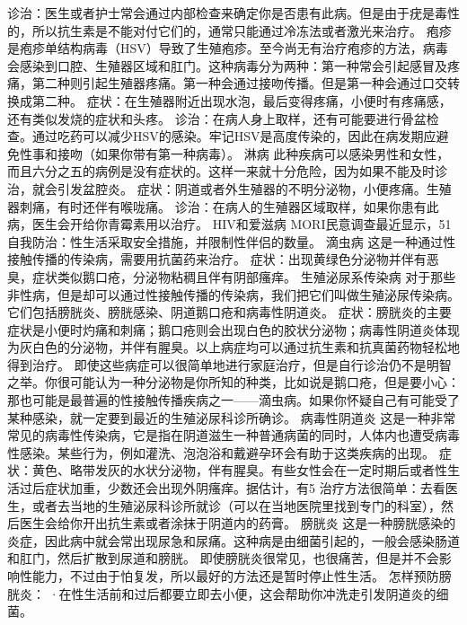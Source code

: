 \documentclass[12pt,UTF8,openany]{ctexbook}
\begin{document}
诊治：医生或者护士常会通过内部检查来确定你是否患有此病。但是由于疣是毒性的，所以抗生素是不能对付它们的，通常只能通过冷冻法或者激光来治疗。
疱疹
是疱疹单结构病毒（HSV）导致了生殖疱疹。至今尚无有治疗疱疹的方法，病毒会感染到口腔、生殖器区域和肛门。这种病毒分为两种：第一种常会引起感冒及疼痛，第二种则引起生殖器疼痛。第一种会通过接吻传播。但是第一种会通过口交转换成第二种。
症状：在生殖器附近出现水泡，最后变得疼痛，小便时有疼痛感，还有类似发烧的症状和头疼。
诊治：在病人身上取样，还有可能要进行骨盆检查。通过吃药可以减少HSV的感染。牢记HSV是高度传染的，因此在病发期应避免性事和接吻（如果你带有第一种病毒）。
淋病
此种疾病可以感染男性和女性，而且六分之五的病例是没有症状的。这样一来就十分危险，因为如果不能及时诊治，就会引发盆腔炎。
症状：阴道或者外生殖器的不明分泌物，小便疼痛。生殖器刺痛，有时还伴有喉咙痛。
诊治：在病人的生殖器区域取样，如果你患有此病，医生会开给你青霉素用以治疗。
HIV和爱滋病
MORI民意调查最近显示，51%
自我防治：性生活采取安全措施，并限制性伴侣的数量。
滴虫病
这是一种通过性接触传播的传染病，需要用抗菌药来治疗。
症状：出现黄绿色分泌物并伴有恶臭，症状类似鹅口疮，分泌物粘稠且伴有阴部瘙痒。
生殖泌尿系传染病
对于那些非性病，但是却可以通过性接触传播的传染病，我们把它们叫做生殖泌尿传染病。它们包括膀胱炎、膀胱感染、阴道鹅口疮和病毒性阴道炎。
症状：膀胱炎的主要症状是小便时灼痛和刺痛；鹅口疮则会出现白色的胶状分泌物；病毒性阴道炎体现为灰白色的分泌物，并伴有腥臭。以上病症均可以通过抗生素和抗真菌药物轻松地得到治疗。
即使这些病症可以很简单地进行家庭治疗，但是自行诊治仍不是明智之举。你很可能认为一种分泌物是你所知的种类，比如说是鹅口疮，但是要小心：那也可能是最普遍的性接触传播疾病之一——滴虫病。如果你怀疑自己有可能受了某种感染，就一定要到最近的生殖泌尿科诊所确诊。
病毒性阴道炎
这是一种非常常见的病毒性传染病，它是指在阴道滋生一种普通病菌的同时，人体内也遭受病毒性感染。某些行为，例如灌洗、泡泡浴和戴避孕环会有助于这类疾病的出现。
症状：黄色、略带发灰的水状分泌物，伴有腥臭。有些女性会在一定时期后或者性生活过后症状加重，少数还会出现外阴瘙痒。据估计，有5%
治疗方法很简单：去看医生，或者去当地的生殖泌尿科诊所就诊（可以在当地医院里找到专门的科室），然后医生会给你开出抗生素或者涂抹于阴道内的药膏。
膀胱炎
这是一种膀胱感染的炎症，因此病中就会常出现尿急和尿痛。这种病是由细菌引起的，一般会感染肠道和肛门，然后扩散到尿道和膀胱。
即使膀胱炎很常见，也很痛苦，但是并不会影响性能力，不过由于怕复发，所以最好的方法还是暂时停止性生活。
怎样预防膀胱炎：
·在性生活前和过后都要立即去小便，这会帮助你冲洗走引发阴道炎的细菌。
\end{document}

